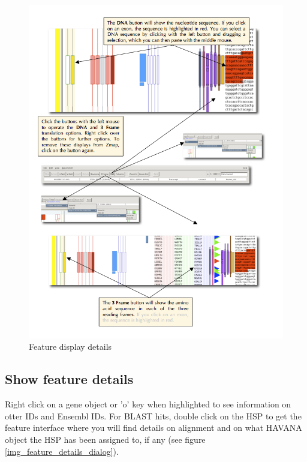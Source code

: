 \documentclass[letterpaper]{article}
\begin{document}
\begin{figure}
\centering
\color[rgb]{0.30980393,0.5058824,0.7411765}
\includegraphics[width=15.231cm]{img_feature_display_details.png}
\caption{Feature display details}
\label{img_feature_display_details}
\end{figure}


\subsection{Show feature details}
Right click on a gene object or 'o' key when highlighted to see information on otter IDs and Ensembl IDs. For BLAST hits, double click on the HSP to get the feature interface where you will find details on alignment and on what HAVANA object the HSP has been assigned to, if any (see figure \ref{img_feature_details_dialog}).
\end{document}

